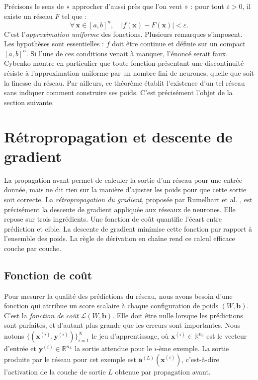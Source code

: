 \documentclass[a4paper,french]{style-LaTeX}
\begin{document}
Précisons le sens de « approcher d'aussi près que l'on veut » : pour tout $\varepsilon > 0$, il existe un réseau $F$ tel que :
\begin{equation*}
  \forall\, \mathbf{x} \in [a,b]^n, \quad |f(\mathbf{x}) - F(\mathbf{x})| < \varepsilon.
\end{equation*}
C'est l'\emph{approximation uniforme} des fonctions. Plusieurs remarques s'imposent. Les hypothèses sont essentielles : $f$ doit être continue et définie sur un compact $[a,b]^n$. Si l'une de ces conditions venait à manquer, l'énoncé serait faux. Cybenko \cite{Cybenko89} montre en particulier que toute fonction présentant une discontinuité résiste à l'approximation uniforme par un nombre fini de neurones, quelle que soit la finesse du réseau. Par ailleurs, ce théorème établit l'existence d'un tel réseau sans indiquer comment construire ses poids. C'est précisément l'objet de la section suivante.


\section{Rétropropagation et descente de gradient}

La propagation avant permet de calculer la sortie d'un réseau pour une entrée donnée, mais ne dit rien sur la manière d'ajuster les poids pour que cette sortie soit correcte. La \emph{rétropropagation du gradient}, proposée par Rumelhart et al. \cite{Rumelhart86}, est précisément la descente de gradient appliquée aux réseaux de neurones. Elle repose sur trois ingrédients. Une fonction de coût quantifie l'écart entre prédiction et cible. La descente de gradient minimise cette fonction par rapport à l'ensemble des poids. La règle de dérivation en chaîne rend ce calcul efficace couche par couche.

\subsection*{Fonction de coût}

Pour mesurer la qualité des prédictions du réseau, nous avons besoin d'une fonction qui attribue un score scalaire à chaque configuration de poids $(W, \mathbf{b})$. C'est la \emph{fonction de coût} $\mathcal{L}(W, \mathbf{b})$. Elle doit être nulle lorsque les prédictions sont parfaites, et d'autant plus grande que les erreurs sont importantes. Nous notons $\{(\mathbf{x}^{(i)}, \mathbf{y}^{(i)})\}_{i=1}^{N}$ le jeu d'apprentissage, où $\mathbf{x}^{(i)} \in \mathbb{R}^{n_0}$ est le vecteur d'entrée et $\mathbf{y}^{(i)} \in \mathbb{R}^{n_L}$ la sortie attendue pour le $i$-ème exemple. La sortie produite par le réseau pour cet exemple est $\mathbf{a}^{(L)}(\mathbf{x}^{(i)})$, c'est-à-dire l'activation de la couche de sortie $L$ obtenue par propagation avant.
\end{document}

